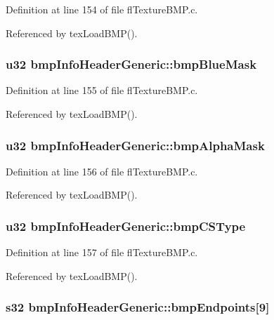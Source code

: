 Definition at line 154 of file fl\-Texture\-BMP.c.

Referenced by tex\-Load\-BMP().
\subsubsection{\setlength{\rightskip}{0pt plus 5cm}u32 {\bf bmp\-Info\-Header\-Generic::bmp\-Blue\-Mask}}\label{structbmpInfoHeaderGeneric_b35daf68b6a3db5b8d2968a0e17bcc91}




Definition at line 155 of file fl\-Texture\-BMP.c.

Referenced by tex\-Load\-BMP().
\subsubsection{\setlength{\rightskip}{0pt plus 5cm}u32 {\bf bmp\-Info\-Header\-Generic::bmp\-Alpha\-Mask}}\label{structbmpInfoHeaderGeneric_5a8624bd03bca5ae3fb6d8508bd927f2}




Definition at line 156 of file fl\-Texture\-BMP.c.

Referenced by tex\-Load\-BMP().
\subsubsection{\setlength{\rightskip}{0pt plus 5cm}u32 {\bf bmp\-Info\-Header\-Generic::bmp\-CSType}}\label{structbmpInfoHeaderGeneric_aa68d366a7c1d4417e7462d175a1dc1e}




Definition at line 157 of file fl\-Texture\-BMP.c.

Referenced by tex\-Load\-BMP().
\subsubsection{\setlength{\rightskip}{0pt plus 5cm}s32 {\bf bmp\-Info\-Header\-Generic::bmp\-Endpoints}[9]}\label{structbmpInfoHeaderGeneric_a5abf31075a96ebe5d4e18404b6eb15e}




